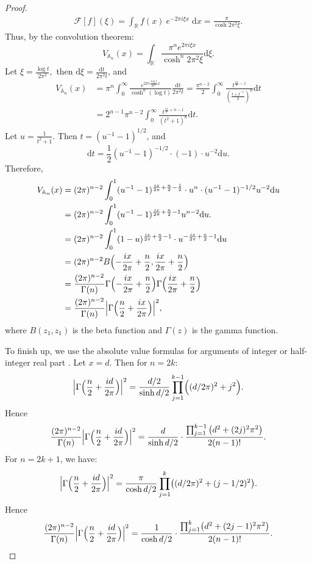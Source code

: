 \documentclass{amsart}
\newcommand{\RR}{\mathbb{R}}
\theoremstyle{definition}
\begin{document}
\begin{proof}
\begin{align}
\mathcal{F}[f](\xi)  
= \int_\RR f(x)\ e^{-2\pi i \xi x}\; \mathrm{d}x 
= \frac{\pi}{\cosh{2\pi^2\xi}}. 
\end{align}
Thus, by the convolution theorem:
\[
V_{\mathbb{A}_n}(x) = 
\int_{\RR} \frac{\pi^n e^{2\pi i\xi x}}{\cosh^n{2\pi^2 \xi}} \mathrm{d}\xi .
\]
Let $\xi = \frac{\log t}{2\pi^2},$ then $\mathrm{d}\xi = \frac{\mathrm{d}t}{2\pi^2 t}$, and
\begin{equation*}
\begin{split}
V_{\mathbb{A}_n}(x) &  = \pi^n \int_{0}^\infty \frac{e^{2\pi i  \frac{\log t}{2\pi^2} x }}{\cosh^n({\log t})} \frac{\mathrm{d}t}{2\pi^2 t} = \frac{\pi^{n-2}}{2} \int_0^\infty \frac{t^{\frac{ix}{\pi}-1}}{\left(\frac{t+t^{-1}}{2}\right)^n}\mathrm{d}t  \\&= 2^{n-1}\pi^{n-2} \int_0^\infty \frac{t^{\frac{ix}{\pi}+n-1}}{(t^2+1)^n}\mathrm{d}t.
\end{split}
\end{equation*}
Let $u = \frac{1}{t^2+1}$. Then $t = (u^{-1}-1)^{1/2}$, and 
\[
\mathrm{d}t = \frac{1}{2}(u^{-1}-1)^{-1/2}\cdot (-1)\cdot u^{-2}\mathrm{d}u.
\] 
Therefore,
\begin{align*}
V_{\mathbb{A}_n}(x) & = (2\pi)^{n-2} \int_{0}^1 (u^{-1}-1)^{\frac{ix}{2\pi}+\frac{n}{2}-\frac{1}{2}}\cdot u^n \cdot  (u^{-1}-1)^{-1/2} u^{-2}\mathrm{d}u \\&
= (2\pi)^{n-2} \int_0^1 (u^{-1}-1)^{\frac{ix}{2\pi}+\frac{n}{2}-1} u^{n-2} \mathrm{d}u.
\\& = (2\pi)^{n-2} \int_0^1 (1-u)^{\frac{ix}{2\pi}+\frac{n}{2}-1}\cdot u^{-\frac{ix}{2\pi}+\frac{n}{2}-1}\mathrm{d}u \\&
= (2\pi)^{n-2} B \Bigl(-\frac{ix}{2\pi}+\frac{n}{2}, \frac{ix}{2\pi}+\frac{n}{2} \Bigr) \\& = \frac{(2\pi)^{n-2}}{\Gamma(n)}\Gamma\Bigl(-\frac{ix}{2\pi}+\frac{n}{2}\Bigr)\Gamma\Bigl(\frac{ix}{2\pi}+\frac{n}{2}\Bigr) \\& = \frac{(2\pi)^{n-2}}{\Gamma(n)} \Big|\Gamma\Bigl(\frac{n}{2}+\frac{ix}{2\pi}\Bigr)\Big|^2,
\end{align*}
where $B(z_1,z_1)$ is the beta function and $\Gamma(z)$ is the gamma function.\medskip

To finish up, we use the absolute value formulas for arguments of integer or half-integer real part \cite[Equation~1.2(8)-(9)]{batemanHTF1}.
Let $x = d$. Then for $n = 2k$:
\[
\Big|\Gamma\Bigl(\frac{n}{2}+\frac{id}{2\pi}\Bigr)\Big|^2 = \frac{d/2}{\sinh{d/2}} \prod_{j=1}^{k-1} \Bigl((d/2\pi)^2+j^2\Bigr).
\]
Hence
\[
\frac{(2\pi)^{n-2}}{\Gamma(n)} \Big|\Gamma\Bigl(\frac{n}{2}+\frac{id}{2\pi}\Bigr)\Big|^2 = \frac{d}{\sinh{d/2}} \cdot \frac{\prod_{j=1}^{k-1} \big(d^2+(2j)^2\pi^2\big)}{2(n-1)!}.
\]
For $n = 2k+1$, we have:
\[
\Big|\Gamma\Bigl(\frac{n}{2}+\frac{id}{2\pi}\Bigr)\Big|^2 = \frac{\pi}{\cosh{d/2}} \prod_{j=1}^{k} \bigl((d/2\pi)^2+(j-1/2)^2\bigr).
\]
Hence
\[
\frac{(2\pi)^{n-2}}{\Gamma(n)} \Big|\Gamma\Bigl(\frac{n}{2}+\frac{id}{2\pi}\Bigr)\Big|^2 = \frac{1}{\cosh{d/2}} \cdot \frac{\prod_{j=1}^{k} \bigl(d^2+(2j-1)^2\pi^2\bigr)}{2(n-1)!}.
\]
\end{proof}
\end{document}
